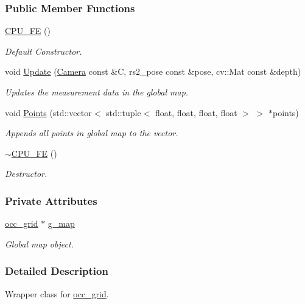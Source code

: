 \subsubsection*{Public Member Functions}
\begin{DoxyCompactItemize}
\item 
\hyperlink{classCPU__FE_a17780bbe106fb8f752e06987b5eefc7f}{C\+P\+U\+\_\+\+FE} ()
\begin{DoxyCompactList}\small\item\em Default Constructor. \end{DoxyCompactList}\item 
void \hyperlink{classCPU__FE_aae7cb60a405b294a680a929ecff5c2ae}{Update} (\hyperlink{classCamera}{Camera} const \&C, rs2\+\_\+pose const \&pose, cv\+::\+Mat const \&depth)
\begin{DoxyCompactList}\small\item\em Updates the measurement data in the global map. \end{DoxyCompactList}\item 
void \hyperlink{classCPU__FE_a4b085e590daa33cf1e2f100a58236009}{Points} (std\+::vector$<$ std\+::tuple$<$ float, float, float, float $>$ $>$ $\ast$points)
\begin{DoxyCompactList}\small\item\em Appends all points in global map to the vector. \end{DoxyCompactList}\item 
\hyperlink{classCPU__FE_a425dc3014e22d7aeaaf261ac945f4da1}{$\sim$\+C\+P\+U\+\_\+\+FE} ()
\begin{DoxyCompactList}\small\item\em Destructor. \end{DoxyCompactList}\end{DoxyCompactItemize}
\subsubsection*{Private Attributes}
\begin{DoxyCompactItemize}
\item 
\hyperlink{classocc__grid}{occ\+\_\+grid} $\ast$ \hyperlink{classCPU__FE_ad3779fc0a23127e425d8f0fc3c2661dc}{g\+\_\+map}
\begin{DoxyCompactList}\small\item\em Global map object. \end{DoxyCompactList}\end{DoxyCompactItemize}


\subsubsection{Detailed Description}
Wrapper class for \hyperlink{classocc__grid}{occ\+\_\+grid}. 

